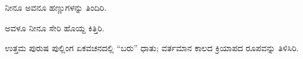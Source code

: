 \noindent\hspace*{1.2em}\hspace{0.6em}ನೀನೂ ಅವನೂ ಹಣ್ಣುಗಳನ್ನು ತಿಂದಿರಿ.\par

\noindent\hspace*{2.2em}ಅವಳೂ ನೀನೂ ಸೇರಿ ಹೊಯ್ದ ಕಿತ್ತಿರಿ.\par


\vspace{2.5pt plus 3pt minus 0.5pt}\noindent\hspace*{1.2em}\kbvnum{{[}1{]}}\hspace{0.55em}ಉತ್ತಮ ಪುರುಷ ಪುಲ್ಲಿಂಗ ಏಕವಚನದಲ್ಲಿ “ಬರು” ಧಾತು; ವರ್ತಮಾನ ಕಾಲದ ಕ್ರಿಯಾಪದ ರೂಪವನ್ನು ತಿಳಿಸಿರಿ.\par
